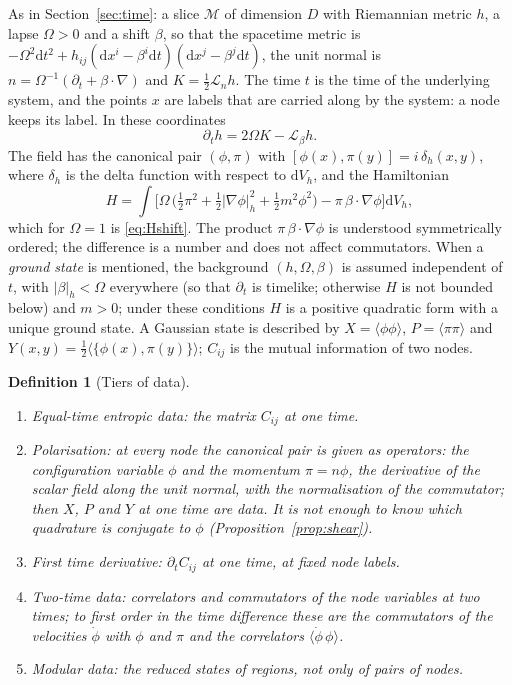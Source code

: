 \documentclass[11pt,a4paper]{article}
\theoremstyle{stmt}
\theoremstyle{defn}
\newtheorem{definition}[theorem]{Definition}
\theoremstyle{rmk}
\numberwithin{equation}{section}
\newcommand{\Lie}{\mathcal{L}}
\newcommand{\M}{\mathcal{M}}
\newcommand{\dd}{\mathrm{d}}
\begin{document}
{As in Section~\ref{sec:time}: a slice $\M$ of dimension $D$ with Riemannian metric $h$, a lapse $\Omega>0$ and a shift $\beta$, so that the spacetime metric is $-\Omega^2\dd t^2+h_{ij}(\dd x^i-\beta^i\dd t)(\dd x^j-\beta^j\dd t)$, the unit normal is $n=\Omega^{-1}(\partial_t+\beta\cdot\nabla)$ and $K=\tfrac12\Lie_nh$. The time $t$ is the time of the underlying system, and the points $x$ are labels that are carried along by the system: a node keeps its label. In these coordinates
\begin{equation}\label{eq:hdot}
\partial_th=2\Omega K-\Lie_\beta h .
\end{equation}
The field has the canonical pair $(\phi,\pi)$ with $[\phi(x),\pi(y)]=i\,\delta_h(x,y)$, where $\delta_h$ is the delta function with respect to $\dd V_h$, and the Hamiltonian
\begin{equation}\label{eq:H}
H=\int\Big[\Omega\,\big(\tfrac12\pi^2+\tfrac12|\nabla\phi|_h^2+\tfrac12m^2\phi^2\big)-\pi\,\beta\cdot\nabla\phi\Big]\dd V_h ,
\end{equation}
which for $\Omega=1$ is \eqref{eq:Hshift}. The product $\pi\,\beta\cdot\nabla\phi$ is understood symmetrically ordered; the difference is a number and does not affect commutators. When a \emph{ground state} is mentioned, the background $(h,\Omega,\beta)$ is assumed independent of $t$, with $|\beta|_h<\Omega$ everywhere (so that $\partial_t$ is timelike; otherwise $H$ is not bounded below) and $m>0$; under these conditions $H$ is a positive quadratic form with a unique ground state. A Gaussian state is described by $X=\langle\phi\phi\rangle$, $P=\langle\pi\pi\rangle$ and $Y(x,y)=\tfrac12\langle\{\phi(x),\pi(y)\}\rangle$; $C_{ij}$ is the mutual information of two nodes.

\begin{definition}[Tiers of data]\label{def:tiers}
\begin{enumerate}[label=\textup{(D\arabic*)},start=0]
\item \emph{Equal-time entropic data:} the matrix $C_{ij}$ at one time.
\item \emph{Polarisation:} at every node the canonical pair is given \emph{as operators}: the configuration variable $\phi$ and the momentum $\pi=n\phi$, the derivative of the scalar field along the unit normal, with the normalisation of the commutator; then $X$, $P$ and $Y$ at one time are data. It is not enough to know which quadrature is conjugate to $\phi$ (Proposition~\ref{prop:shear}).
\item \emph{First time derivative:} $\partial_tC_{ij}$ at one time, at fixed node labels.
\item \emph{Two-time data:} correlators and commutators of the node variables at two times; to first order in the time difference these are the commutators of the velocities $\dot\phi$ with $\phi$ and $\pi$ and the correlators $\langle\dot\phi\,\phi\rangle$.
\item \emph{Modular data:} the reduced states of regions, not only of pairs of nodes.
\end{enumerate}
\end{definition}

}
\end{document}
